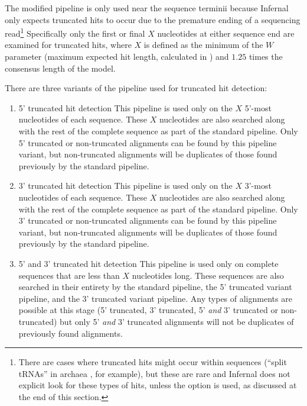 \begin{sreoutput}
The modified pipeline is only used near the sequence terminii because
Infernal only expects truncated hits to occur due to the premature
ending of a sequencing read\footnote{There are cases where truncated
hits might occur within sequences (``split tRNAs'' in archaea
\citep{Randau05}, for example), but these are rare and Infernal does
not explicit look for these types of hits, unless the
 option is used, as discussed at the end of this
section.} Specifically only the first or final $X$ nucleotides at
either sequence end are examined for truncated hits, where $X$ is
defined as the minimum of the $W$ parameter (maximum expected hit
length, calculated in ) and $1.25$ times the consensus
length of the model.

There are three variants of the pipeline used for truncated hit
detection:

\begin{enumerate}

\item  5' truncated hit detection
This pipeline is used only on the $X$ 5'-most nucleotides of each
sequence. These $X$ nucleotides are also searched along with the rest
of the complete sequence as part of the standard pipeline. Only 5'
truncated or non-truncated alignments can be found by this pipeline
variant, but non-truncated alignments will be duplicates of
those found previously by the standard pipeline. 

\item  3' truncated hit detection
This pipeline is used only on the $X$ 3'-most nucleotides of each
sequence. These $X$ nucleotides are also searched along with the rest
of the complete sequence as part of the standard pipeline. Only 3'
truncated or non-truncated alignments can be found by this pipeline
variant, but non-truncated alignments will be duplicates of
those found previously by the standard pipeline. 

\item  5' and 3' truncated hit detection
This pipeline is used only on complete sequences that are less than
$X$ nucleotides long. These sequences are also searched in their
entirety by the standard pipeline, the 5' truncated variant pipeline,
and the 3' truncated variant pipeline. Any types of alignments are
possible at this stage (5' truncated, 3' truncated, 5' \emph{and} 3'
truncated or non-truncated) but only 5' \emph{and} 3' truncated
alignments will not be duplicates of previously found alignments. 


\end{enumerate}
\end{sreoutput}
